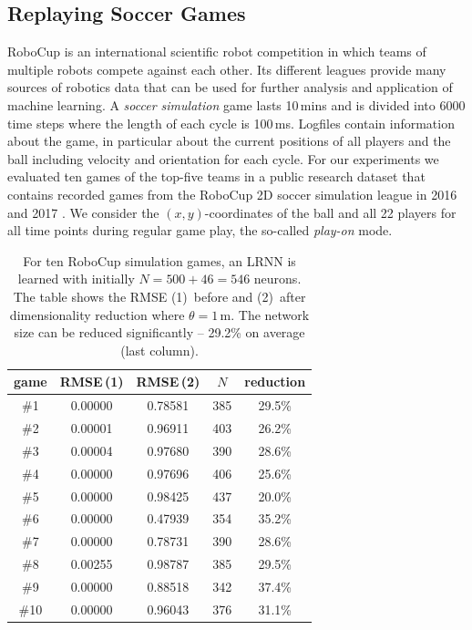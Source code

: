 \documentclass{sn-jnl}
\theoremstyle{definition}
\newcommand{\head}[1]{\multicolumn{1}{c}{#1}}
\begin{document}
\subsection{Replaying Soccer Games}\label{soccer}

RoboCup \citep{KA+97} is an international scientific robot competition in which
teams of multiple robots compete against each other. Its different leagues
provide many sources of robotics data that can be used for further analysis and
application of machine learning. A \emph{soccer simulation} game lasts 10\,mins and is
divided into 6000 time steps where the length of each cycle is 100\,ms. Logfiles
contain information about the game, in particular about the current positions of
all players and the ball including velocity and orientation for each cycle.
For our experiments we evaluated ten games of the top-five teams in a public
research dataset \citep{MO+19} that contains recorded games from the RoboCup 2D
soccer simulation league \citep{CDF+03,GFG16} in 2016 and 2017
\citep{MO+18}. We consider the
$(x,y)$-coordinates of the ball and all 22 players for all time points during
regular game play, the so-called \emph{play-on} mode.

\begin{table}
\centering
{}%
\begin{tabular}[b]{cSScc}
	\toprule
	\head{game} & \head{RMSE\,(1)} & \head{RMSE\,(2)} & \head{$N$} & \head{reduction}\\ \midrule
	\#1 & 0.00000 & 0.78581 & 385 & 29.5\%\\
	\#2 & 0.00001 & 0.96911 & 403 & 26.2\% \\
	\#3 & 0.00004 & 0.97680 & 390 & 28.6\% \\
	\#4 & 0.00000 & 0.97696 & 406 & 25.6\% \\
	\#5 & 0.00000 & 0.98425 & 437 & 20.0\% \\
	\#6 & 0.00000 & 0.47939 & 354 & 35.2\% \\
	\#7 & 0.00000 & 0.78731 & 390 & 28.6\% \\
	\#8 & 0.00255 & 0.98787 & 385 & 29.5\% \\
	\#9 & 0.00000 & 0.88518 & 342 & 37.4\% \\
	\#10 & 0.00000 & 0.96043 & 376 & 31.1\% \\
	\bottomrule
  \end{tabular}
  \caption{For ten RoboCup simulation games, an LRNN is learned with initially
	$N = 500+46 = 546$ neurons. The table shows the RMSE
	(1)~before and (2)~after dimensionality reduction where $\theta=1$\,m. The
	network size can be reduced significantly -- 29.2\% on average
	(last column).}
  \label{robocup}
\end{table}
\end{document}
